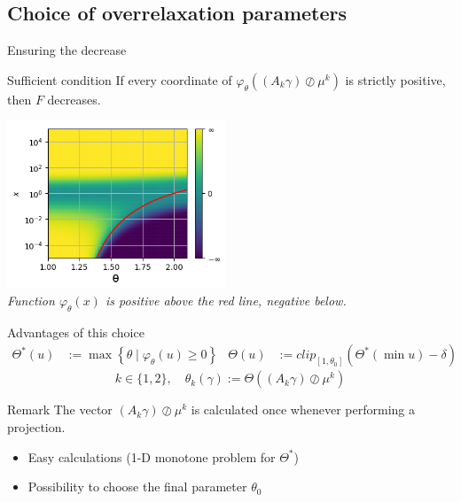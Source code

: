 \documentclass[compress]{beamer}
\begin{document}
\subsection[Choice of OR parameters]{Choice of overrelaxation parameters}
\begin{frame}{Ensuring the decrease}
\begin{block}{Sufficient condition}
	If every coordinate of $\varphi_\theta \left((A_k \gamma) \oslash \mu^k \right)$ is strictly positive, then $F$ decreases.
\end{block}
\begin{center}
	\vspace*{-0.2cm}\includegraphics[height=5cm]{images/cvgce_zone_2.png}\vspace{-0.2cm}\\
	{\small \em Function $\varphi_\theta(x)$ is positive above the red line, negative below.}
\end{center}
\end{frame}

\begin{frame}{Advantages of this choice}
	\begin{align*}
	\Theta^*(u) &:= \max \left\{\theta \mid \varphi_\theta(u) \ge 0 \right\}
	&
	\Theta(u) &:= clip_{[1,\theta_0]}(\Theta^*(\min u)-\delta)
	\end{align*}
	\[
	k \in \{1,2\}, \quad \theta_k (\gamma) := \Theta((A_k \gamma) \oslash \mu^k)
	\]
	
	\begin{block}{Remark}
		The vector $(A_k \gamma)\oslash \mu^k$ is calculated once whenever performing a projection.
	\end{block}
	\pause
	\begin{itemize}
		\item Easy calculations (1-D monotone problem for $\Theta^*$)
		\item Possibility to choose the final parameter $\theta_0$
	\end{itemize}
\end{frame}
\end{document}
